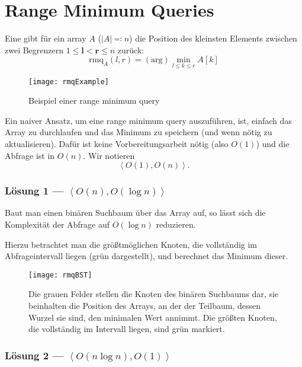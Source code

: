 \chapter{Range Minimum Queries}

Eine  gibt für ein array \( A \) (\( \left\vert A \right\vert \eqqcolon n \)) die Position des kleinsten Elements zwischen zwei Begrenzern \( 1 \leq \bm{l} < \bm{r} \leq n \) zurück:
\begin{equation*}
  \text{rmq}_A(l,r) = (\text{arg})\min_{l \leq k \leq r}A[k]
\end{equation*}

\begin{figure}[H]
  \texttt{[image: rmqExample]}
  \caption{Beispiel einer range minimum query}
\end{figure}

Ein naiver Ansatz, um eine range minimum query auszuführen, ist, einfach das Array zu durchlaufen und das Minimum zu speichern (und wenn nötig zu aktualisieren). Dafür ist keine Vorbereitungsarbeit nötig (also \( O(1) \)) und die Abfrage ist in \( O(n) \). Wir notieren
\begin{equation*}
  \left\langle O(1), O(n) \right\rangle\text{.}
\end{equation*}

\subsection{Lösung 1 --- \( \left\langle O(n), O(\log n) \right\rangle \)}

Baut man einen binären Suchbaum über das Array auf, so lässt sich die Komplexität der Abfrage auf \( O(\log n) \) reduzieren.

Hierzu betrachtet man die größtmöglichen Knoten, die vollständig im Abfrageintervall liegen (grün dargestellt), und berechnet das Minimum dieser.

\begin{figure}[H]
  \texttt{[image: rmqBST]}
  \caption{Die grauen Felder stellen die Knoten des binären Suchbaums dar, sie beinhalten die Position des Arrays, an der der Teilbaum, dessen Wurzel sie sind, den minimalen Wert annimmt. Die größten Knoten, die vollständig im Intervall liegen, sind grün markiert.}
\end{figure}

\subsection{Lösung 2 --- \( \left\langle O(n\log n),O(1) \right\rangle \)}

